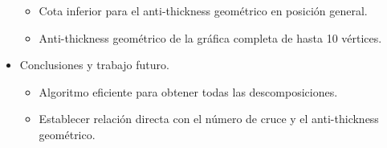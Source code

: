 \documentclass[12pt, letterpaper]{article}
\begin{document}
\begin{itemize}
\begin{itemize}
      \item Cota inferior para el anti-thickness geométrico en posición general.
      \item Anti-thickness geométrico de la gráfica completa de hasta 10 vértices.
    \end{itemize}
  \item Conclusiones y trabajo futuro.
  \begin{itemize}
    \item Algoritmo eficiente para obtener todas las descomposiciones.
    \item Establecer relación directa con el número de cruce y el anti-thickness geométrico.
  \end{itemize}
\end{itemize}
\end{document}
